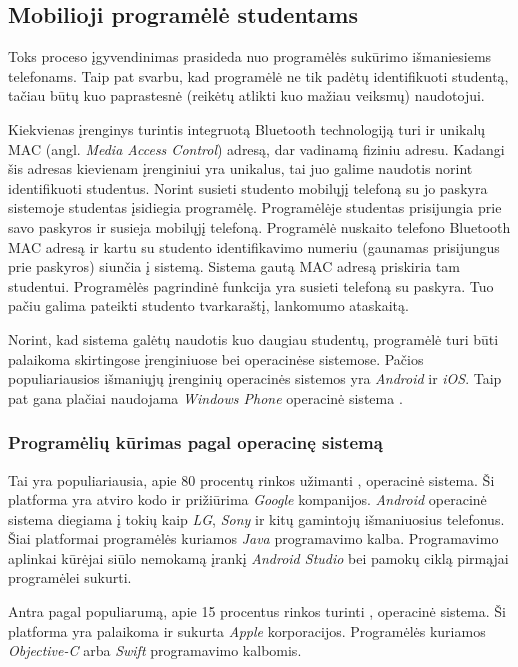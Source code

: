 \documentclass{VUMIFPSkursinis}
\begin{document}
\subsection{Mobilioji programėlė studentams} \label{StudentApp}
Toks proceso įgyvendinimas prasideda nuo programėlės sukūrimo išmaniesiems telefonams. Taip pat svarbu, kad programėlė ne tik padėtų identifikuoti studentą, tačiau būtų kuo paprastesnė (reikėtų atlikti kuo mažiau veiksmų) naudotojui.

Kiekvienas įrenginys turintis integruotą Bluetooth technologiją turi ir unikalų MAC (angl. \textit{Media Access Control}) adresą, dar vadinamą fiziniu adresu. Kadangi šis adresas kievienam įrenginiui yra unikalus, tai juo galime naudotis norint identifikuoti studentus. Norint susieti studento mobilųjį telefoną su jo paskyra sistemoje studentas įsidiegia programėlę. Programėlėje studentas prisijungia prie savo paskyros ir susieja mobilųjį telefoną. Programėlė nuskaito telefono Bluetooth MAC adresą ir kartu su studento identifikavimo numeriu (gaunamas prisijungus prie paskyros) siunčia į sistemą. Sistema gautą MAC adresą priskiria tam studentui. Programėlės pagrindinė funkcija yra susieti telefoną su paskyra. Tuo pačiu galima pateikti studento tvarkaraštį, lankomumo ataskaitą.

Norint, kad sistema galėtų naudotis kuo daugiau studentų, programėlė turi būti palaikoma skirtingose įrenginiuose bei operacinėse sistemose. Pačios populiariausios išmaniųjų įrenginių operacinės sistemos yra \textit{Android} ir \textit{iOS}. Taip pat gana plačiai naudojama \textit{Windows Phone} operacinė sistema \cite{MarketShareByOS}.

\subsubsection{Programėlių kūrimas pagal operacinę sistemą}

Tai yra populiariausia, apie 80 procentų rinkos užimanti \cite{MarketShareByOS}, operacinė sistema. Ši platforma yra atviro kodo ir prižiūrima \textit{Google} kompanijos. \textit{Android} operacinė sistema diegiama į tokių kaip \textit{LG}, \textit{Sony} ir kitų gamintojų išmaniuosius telefonus. Šiai platformai programėlės kuriamos \textit{Java} programavimo kalba. Programavimo aplinkai kūrėjai siūlo nemokamą įrankį \textit{Android Studio} bei pamokų ciklą pirmąjai programėlei sukurti.

Antra pagal populiarumą, apie 15 procentus rinkos turinti \cite{MarketShareByOS}, operacinė sistema. Ši platforma yra palaikoma ir sukurta \textit{Apple} korporacijos. Programėlės kuriamos \textit{Objective-C} arba \textit{Swift} programavimo kalbomis.
\end{document}
